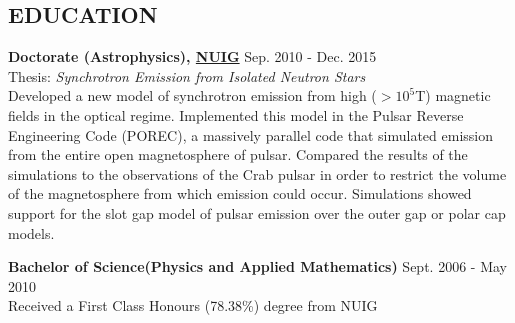 \documentclass[margin, 10pt]{res} %
\begin{document}
\begin{resume}

% 



\section{EDUCATION}
{\bf Doctorate (Astrophysics),  \href{http://www.nuig.ie}{NUIG} }\hfill Sep. 2010 - Dec. 2015 \\
 Thesis: {\sl Synchrotron Emission from Isolated Neutron Stars}\\
Developed a new model of synchrotron emission from high ($>10^{5}$T) magnetic fields in the optical regime. Implemented 
this model in the Pulsar Reverse Engineering Code (POREC), a massively parallel code that simulated emission from the entire
open magnetosphere of pulsar.   Compared the results of the simulations to the observations of the Crab pulsar in order to 
restrict the volume of the magnetosphere from which emission could occur. Simulations showed support for the slot gap model
of pulsar emission over the outer gap or polar cap models.

{\bf Bachelor of Science(Physics and Applied Mathematics)} \hfill Sept. 2006 - May 2010 \\
Received a First Class Honours (78.38\%) degree from NUIG \\


\end{resume}
\end{document}
